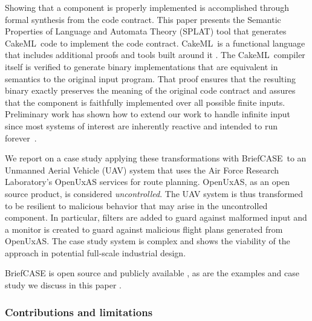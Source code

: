 \documentclass[global,twocolumn]{svjour}
\newcommand{\brfcs}{BriefCASE}
\newcommand{\splt}{SPLAT}
\newcommand{\ckml}{CakeML}
\begin{document}
Showing that a component is properly implemented is accomplished through formal synthesis from the code contract.  This paper presents the Semantic Properties of Language and Automata Theory (\splt) tool that generates \ckml\ code to implement the code contract.
%
\ckml\ is a functional language that includes additional proofs and tools built around it \cite{cakeml}.
%
The \ckml\ compiler itself is verified to generate binary implementations that are equivalent in semantics to the original input program.
%
That proof ensures that the resulting binary exactly preserves the meaning of the original code contract and assures that the component is faithfully implemented over all possible finite inputs.
%
Preliminary work has shown how to extend our work to handle infinite input since most systems of interest are inherently reactive and intended to run forever~\cite{case-verified-filter,cakeml-space-cost}.

We report on a case study applying these transformations with \brfcs\ to an Unmanned Aerial Vehicle (UAV) system that uses the Air Force Research Laboratory's OpenUxAS services for route planning.
%
OpenUxAS, as an open source product, is considered \emph{uncontrolled}.
%
The UAV system is thus transformed to be resilient to malicious behavior that may arise in the uncontrolled component.
%
In particular, filters are added to guard against malformed input and a monitor is created to guard against malicious flight plans generated from OpenUxAS.
%
The case study system is complex and shows the viability of the approach in potential full-scale industrial design.

{\brfcs} is open source and publicly available \cite{fmide}, as are the examples and case study we discuss in this paper \cite{repo,
phase2, camkes, case}.


\subsubsection*{Contributions and limitations}
\end{document}
